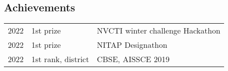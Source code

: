 \documentclass[]{article}
\begin{document}
\begin{multicols}{2}
\begin{flushleft}
    \section{Achievements}
    \begin{tabular}{rll}
      2022 & 1st prize & NVCTI winter challenge Hackathon\\
      2022 & 1st prize & NITAP Designathon\\
      2022 & 1st rank, district & CBSE, AISSCE 2019 \\
    \end{tabular}
  \end{flushleft}
\end{multicols}
\end{document}
